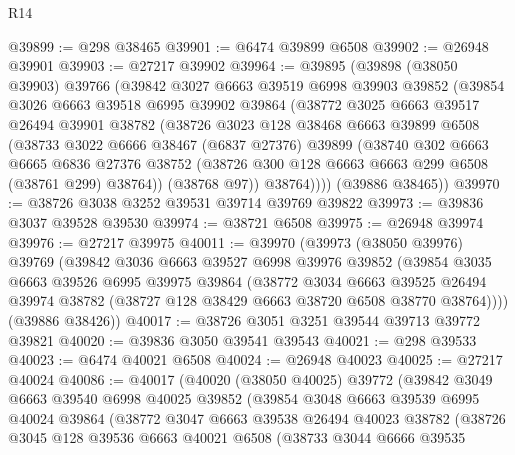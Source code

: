 \begin{lexlean}{R14}
\begin{coremodule}
@39899 := @298 @38465
@39901 := @6474 @39899 @6508
@39902 := @26948 @39901
@39903 := @27217 @39902
@39964 := @39895
    (@39898
      (@38050 @39903)
      @39766
      (@39842
        @3027
        @6663
        @39519
        @6998
        @39903
        @39852
        (@39854
          @3026
          @6663
          @39518
          @6995
          @39902
          @39864
          (@38772
            @3025
            @6663
            @39517
            @26494
            @39901
            @38782
            (@38726
              @3023
              @128
              @38468
              @6663
              @39899
              @6508
              (@38733
                @3022
                @6666
                @38467
                (@6837 @27376)
                @39899
                (@38740
                  @302
                  @6663
                  @6665
                  @6836
                  @27376
                  @38752
                  (@38726 @300 @128 @6663 @6663 @299 @6508 (@38761 @299) @38764))
                (@38768 @97))
              @38764))))
      (@39886 @38465))
@39970 := @38726 @3038 @3252 @39531 @39714 @39769 @39822
@39973 := @39836 @3037 @39528 @39530
@39974 := @38721 @6508
@39975 := @26948 @39974
@39976 := @27217 @39975
@40011 := @39970
    (@39973
      (@38050 @39976)
      @39769
      (@39842
        @3036
        @6663
        @39527
        @6998
        @39976
        @39852
        (@39854
          @3035
          @6663
          @39526
          @6995
          @39975
          @39864
          (@38772
            @3034
            @6663
            @39525
            @26494
            @39974
            @38782
            (@38727 @128 @38429 @6663 @38720 @6508 @38770 @38764))))
      (@39886 @38426))
@40017 := @38726 @3051 @3251 @39544 @39713 @39772 @39821
@40020 := @39836 @3050 @39541 @39543
@40021 := @298 @39533
@40023 := @6474 @40021 @6508
@40024 := @26948 @40023
@40025 := @27217 @40024
@40086 := @40017
    (@40020
      (@38050 @40025)
      @39772
      (@39842
        @3049
        @6663
        @39540
        @6998
        @40025
        @39852
        (@39854
          @3048
          @6663
          @39539
          @6995
          @40024
          @39864
          (@38772
            @3047
            @6663
            @39538
            @26494
            @40023
            @38782
            (@38726
              @3045
              @128
              @39536
              @6663
              @40021
              @6508
              (@38733
                @3044
                @6666
                @39535

\end{coremodule}
\end{lexlean}
